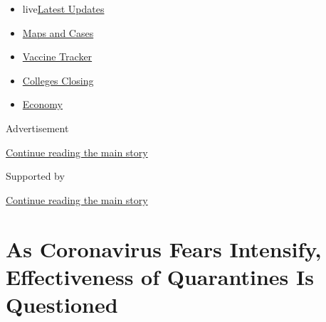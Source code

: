 \begin{itemize}
\tightlist
\item
  live\href{https://www.nytimes3xbfgragh.onion/2020/08/21/world/covid-19-coronavirus.html?name=styln-coronavirus-national\&region=TOP_BANNER\&variant=undefined\&block=storyline_menu_recirc\&action=click\&pgtype=Article\&impression_id=f5ee9610-e3ae-11ea-94af-ff08e013db7e}{Latest
  Updates}
\item
  \href{https://www.nytimes3xbfgragh.onion/interactive/2020/us/coronavirus-us-cases.html?name=styln-coronavirus-national\&region=TOP_BANNER\&variant=undefined\&block=storyline_menu_recirc\&action=click\&pgtype=Article\&impression_id=f5ee9611-e3ae-11ea-94af-ff08e013db7e}{Maps
  and Cases}
\item
  \href{https://www.nytimes3xbfgragh.onion/interactive/2020/science/coronavirus-vaccine-tracker.html?name=styln-coronavirus-national\&region=TOP_BANNER\&variant=undefined\&block=storyline_menu_recirc\&action=click\&pgtype=Article\&impression_id=f5ee9612-e3ae-11ea-94af-ff08e013db7e}{Vaccine
  Tracker}
\item
  \href{https://www.nytimes3xbfgragh.onion/2020/08/19/us/colleges-closing-covid.html?name=styln-coronavirus-national\&region=TOP_BANNER\&variant=undefined\&block=storyline_menu_recirc\&action=click\&pgtype=Article\&impression_id=f5ee9613-e3ae-11ea-94af-ff08e013db7e}{Colleges
  Closing}
\item
  \href{https://www.nytimes3xbfgragh.onion/live/2020/08/21/business/stock-market-today-coronavirus?name=styln-coronavirus-national\&region=TOP_BANNER\&variant=undefined\&block=storyline_menu_recirc\&action=click\&pgtype=Article\&impression_id=f5ee9614-e3ae-11ea-94af-ff08e013db7e}{Economy}
\end{itemize}

Advertisement

\protect\hyperlink{after-top}{Continue reading the main story}

Supported by

\protect\hyperlink{after-sponsor}{Continue reading the main story}

\hypertarget{as-coronavirus-fears-intensify-effectiveness-of-quarantines-is-questioned}{%
\section{As Coronavirus Fears Intensify, Effectiveness of Quarantines Is
Questioned}\label{as-coronavirus-fears-intensify-effectiveness-of-quarantines-is-questioned}}

